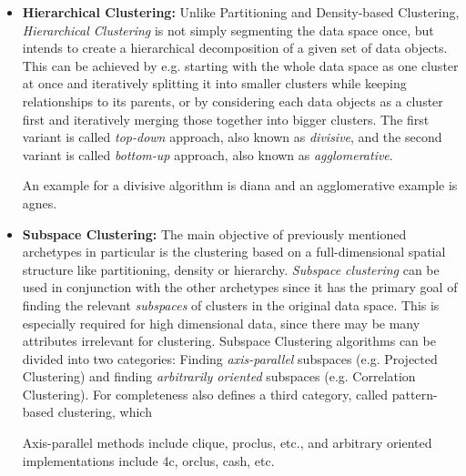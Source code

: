 \begin{itemize}
    \item \textbf{Hierarchical Clustering:} Unlike Partitioning and Density-based Clustering, \textit{Hierarchical Clustering} is not simply segmenting the data space once, but intends to create a hierarchical decomposition of a given set of data objects. This can be achieved by e.g. starting with the whole data space as one cluster at once and iteratively splitting it into smaller clusters while keeping relationships to its parents, or by considering each data objects as a cluster first and iteratively merging those together into bigger clusters. The first variant is called \textit{top-down} approach, also known as \textit{divisive}, and the second variant is called \textit{bottom-up} approach, also known as \textit{agglomerative}\cite[Ch.10.3]{han2011data}. 
    
    An example for a divisive algorithm is \acrshort{diana}\cite[Ch.6]{kaufman2009finding} and an agglomerative example is \acrshort{agnes}\cite[Ch.5]{kaufman2009finding}.
    
    
    \item \textbf{Subspace Clustering:} The main objective of previously mentioned archetypes in particular is the clustering based on a full-dimensional spatial structure like partitioning, density or hierarchy. \textit{Subspace clustering} can be used in conjunction with the other archetypes since it has the primary goal of finding the relevant \textit{subspaces} of clusters in the original data space. This is especially required for high dimensional data, since there may be many attributes irrelevant for clustering\cite{vidal2011subspace}. 
    Subspace Clustering algorithms can be divided into two categories: Finding \textit{axis-parallel} subspaces (e.g. Projected Clustering) and finding \textit{arbitrarily oriented} subspaces (e.g. Correlation Clustering)\cite[Ch.3]{zimek2009correlation}.
    For completeness \textcite{zimek2009correlation} also defines a third category, called pattern-based clustering, which 
    
    
    Axis-parallel methods include \acrshort{clique}\cite{cliqueagrawal1998automatic}, \acrshort{proclus}\cite{proclusaggarwal1999fast}, etc., and arbitrary oriented implementations include \acrshort{4c}\cite{4cbohm2004computing}, \acrshort{orclus}\cite{orclusaggarwal2000finding}, \acrshort{cash}\cite{CASHachtert2008global}, etc.
\end{itemize}

